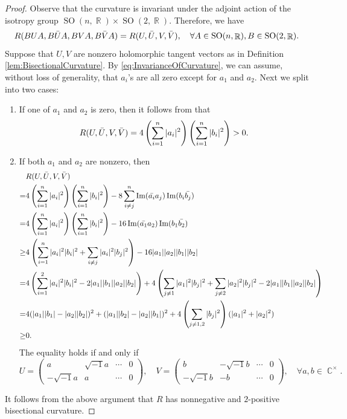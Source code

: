 \documentclass[10pt,a4paper]{amsart}
\DeclareMathOperator{\C}{\mathbb{C}}
\DeclareMathOperator{\Imagine}{Im}
\DeclareMathOperator{\R}{\mathbb{R}}
\DeclareMathOperator{\SO}{SO}
\begin{document}
\begin{proof}
    Observe that the curvature is invariant under the adjoint action of the isotropy group $\SO(n,\R)\times\SO(2,\R)$. Therefore, we have 
    \begin{equation}\label{eq:InvarianceOfCurvature}
    R(BUA,B\Bar{U}A,BVA,B\Bar{V}A)=R(U,\Bar{U},V,\Bar{V}), \quad \forall A\in\SO(n,\R), B\in\SO(2,\R).
    \end{equation}
    Suppose that $U,V$ are nonzero holomorphic tangent vectors as in Definition \ref{lem:BisectionalCurvature}. By \ref{eq:InvarianceOfCurvature}, we can assume, without loss of generality, that $a_i$'s are all zero except for $a_1$ and $a_2$. Next we split into two cases:
    \begin{enumerate}
        \item If one of $a_1$ and $a_2$ is zero, then it follows from  that 
        \[R(U,\Bar{U},V,\Bar{V})=4\left(\sum_{i=1}^n|a_i|^2\right)\left(\sum_{i=1}^n|b_i|^2\right)> 0.\]
        \item If both $a_1$ and $a_2$ are nonzero, then 
        \begin{align*}
            &R(U,\Bar{U},V,\Bar{V})\\
            =&4\left(\sum_{i=1}^n|a_i|^2\right)\left(\sum_{i=1}^n|b_i|^2\right)-8\sum_{i\ne j}^n\Imagine(\Bar{a_i}a_j)\Imagine(b_i\Bar{b_j})\\
            =&4\left(\sum_{i=1}^n|a_i|^2\right)\left(\sum_{i=1}^n|b_i|^2\right)-16\Imagine(\Bar{a_1}a_2)\Imagine(b_1\Bar{b_2})\\
            \ge&4\left(\sum_{i=1}^n|a_i|^2|b_i|^2+\sum_{i\ne j}|a_i|^2|b_j|^2\right)-16|a_1||a_2||b_1||b_2|\\
            =&4\left(\sum_{i=1}^2|a_i|^2|b_i|^2-2|a_1||b_1||a_2||b_2|\right)+4\left(\sum_{j\ne 1}|a_1|^2|b_j|^2+\sum_{j\ne 2}|a_2|^2|b_j|^2-2|a_1||b_1||a_2||b_2|\right)\\
            =&4(|a_1||b_1|-|a_2||b_2|)^2+(|a_1||b_2|-|a_2||b_1|)^2+4\left(\sum_{j\ne 1,2}|b_j|^2\right)(|a_1|^2+|a_2|^2)\\
            \ge&0.
        \end{align*}
        The equality holds if and only if 
        \begin{equation*}
            U=
            \begin{pmatrix}
                a&\sqrt{-1}a&\cdots&0\\
                -\sqrt{-1}a&a&\cdots&0
            \end{pmatrix},
            \quad
            V=\begin{pmatrix}
                b&-\sqrt{-1}b&\cdots&0\\
                -\sqrt{-1}b&-b&\cdots&0
            \end{pmatrix}, \quad \forall a,b\in\C^\times.
        \end{equation*}
    \end{enumerate}
    It follows from the above argument that $R$ has nonnegative and $2$-positive bisectional curvature.
\end{proof}
\end{document}
